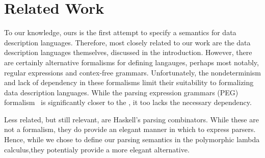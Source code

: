 \section{Related Work}

To our knowledge, ours is the first attempt to specify a semantics for
data description languages. Therefore, most closely related to our
work are the data description languages themselves, discussed in the
introduction.  However, there are certainly alternative formalisms for
defining langauges, perhaps most notably, regular expressions and
contex-free grammars. Unfortunately, the nondeterminism and lack of
dependency in these formalisms limit their suitability to formalizing
data description languages. While the parsing expression grammars
(PEG) formalism~\cite{ford:parsing-expression-grammars} is
significantly closer to the \ddc{}, it too lacks the necessary
dependency.

Less related, but still relevant, are Haskell's parsing
combinators. While these are not a formalism, they do provide an
elegant manner in which to express parsers. Hence, while we chose to
define our parsing semantics in the polymorphic lambda calculus,they
potentialy provide a more elegant alternative.
